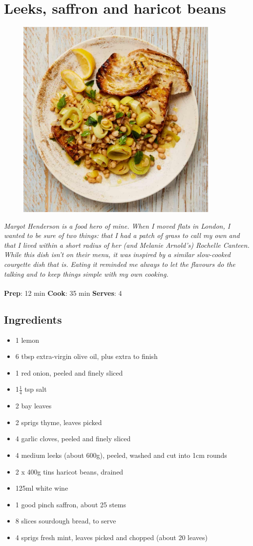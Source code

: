 \documentclass{book}
\begin{document}
\section{Leeks, saffron and haricot beans}
\begin{figure}
\centering\includegraphics[width=10cm,height=10cm,keepaspectratio]{Recipe_Pictures/Leeks,_saffron_and_haricot_beans.png}
\end{figure}
\emph{Margot Henderson is a food hero of mine. When I moved flats in London, I wanted to be sure of two things: that I had a patch of grass to call my own and that I lived within a short radius of her (and Melanie Arnold’s) Rochelle Canteen. While this dish isn’t on their menu, it was inspired by a similar slow-cooked courgette dish that is. Eating it reminded me always to let the flavours do the talking and to keep things simple with my own cooking.}\\\\ 
\textbf{Prep}: 12 min
\textbf{Cook}: 35 min
\textbf{Serves}: 4
\subsection*{Ingredients}
\begin{itemize}
\item 1 lemon
\item 6 tbsp extra-virgin olive oil, plus extra to finish
\item 1 red onion, peeled and finely sliced
\item 1$\frac{1}{4}$ tsp salt
\item 2 bay leaves
\item 2 sprigs thyme, leaves picked
\item 4 garlic cloves, peeled and finely sliced
\item 4 medium leeks (about 600g), peeled, washed and cut into 1cm rounds
\item 2 x 400g tins haricot beans, drained
\item 125ml white wine
\item 1 good pinch saffron, about 25 stems
\item 8 slices sourdough bread, to serve
\item 4 sprigs fresh mint, leaves picked and chopped (about 20 leaves)
\end{itemize}
\end{document}
